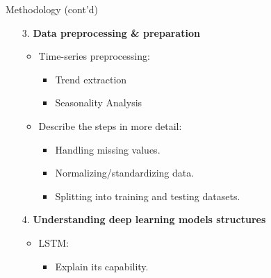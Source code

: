 \documentclass[pt]{beamer}
\newenvironment{tres important}[2][]{
	\setkeys{EmphEqEnv}{#2}
	\setkeys{EmphEqOpt}{box={\setlength{\fboxsep}{10pt}\fcolorbox{myNewColorA}{white}},#1}
	\EmphEqMainEnv}
{\endEmphEqMainEnv}
\begin{document}
\begin{frame}{Methodology (cont'd)}
\begin{itemize}
    \item[3.] \textbf{Data preprocessing \& preparation}
    \begin{itemize}
        \item Time-series preprocessing:
        \begin{itemize}
            \item Trend extraction
            \item Seasonality Analysis
        \end{itemize}
        \item Describe the steps in more detail:
        \begin{itemize}
            \item Handling missing values.
            \item Normalizing/standardizing data.
            \item Splitting into training and testing datasets.
        \end{itemize}
    \end{itemize}

    \item[4.] \textbf{Understanding deep learning models structures}
    \begin{itemize}
        \item LSTM:
        \begin{itemize}
            \item Explain its capability.
        \end{itemize}
    \end{itemize}
\end{itemize}
\end{frame}
\end{document}
